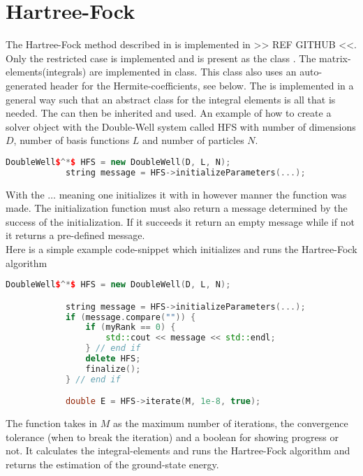 \section{Hartree-Fock}
    The Hartree-Fock method described in  is implemented in
    >> REF GITHUB <<. Only the restricted case is implemented and is present as
    the class . The matrix-elements(integrals) are
    implemented in  class. This class also uses an
    auto-generated header for the Hermite-coefficients, see
     below. The  is
    implemented in a general way such that an abstract class for the integral
    elements is all that is needed. The  can then
    be inherited and used.  An example of how to create a solver object with
    the Double-Well system called HFS with number of dimensions $D$, number of
    basis functions $L$ and number of particles $N$.
        \begin{lstlisting}[language=C++, style=ccstyle]
            DoubleWell$^*$ HFS = new DoubleWell(D, L, N);
            string message = HFS->initializeParameters(...);
        \end{lstlisting}
    With the $\dots$ meaning one initializes it with in however manner the
    function was made. The initialization function must also return a message
    determined by the success of the initialization. If it succeeds it return
    an empty message while if not it returns a pre-defined message. \\ 
    Here is a simple example code-snippet which initializes and runs the
    Hartree-Fock algorithm
        \begin{lstlisting}[language=C++, style=ccstyle]
            DoubleWell$^*$ HFS = new DoubleWell(D, L, N);

            string message = HFS->initializeParameters(...);
            if (message.compare("")) {
                if (myRank == 0) {
                    std::cout << message << std::endl;
                } // end if
                delete HFS;
                finalize();
            } // end if

            double E = HFS->iterate(M, 1e-8, true);
        \end{lstlisting}
    The  function takes in $M$ as the maximum number of
    iterations, the convergence tolerance (when to break the iteration) and a
    boolean for showing progress or not. It calculates the integral-elements
    and runs the Hartree-Fock algorithm and returns the estimation of the
    ground-state energy.

